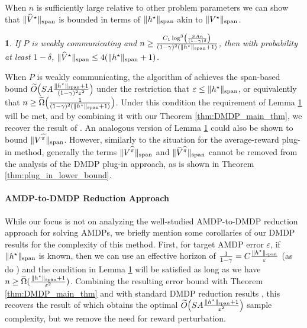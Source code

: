 \documentclass{article}
\theoremstyle{plain}
\theoremstyle{plain}
\newtheorem{lem}[thm]{\protect\lemmaname}
\theoremstyle{remark}
\theoremstyle{plain}
\theoremstyle{plain}
\providecommand{\lemmaname}{Lemma}
\newcommand{\Vhat}{\widehat{V}}
\newcommand{\pihat}{\widehat{\pi}}
\newcommand{\Otilde}{\widetilde{O}}
\newcommand\cig[1]{\scalerel*[5.5pt]{\Big#1}{%
  \ensurestackMath{\addstackgap[1.5pt]{\big#1}}}}
\newcommand{\plugin}{plug-in\xspace}
\begin{document}
When $n$ is sufficiently large relative to other problem parameters we can show that $\spannorm{\Vhat^\star}$ is bounded in terms of $\Vert h^\star\Vert _{\textnormal{span}}$ akin to $\Vert V^\star\Vert _{\textnormal{span}}$.
\begin{lem}
    \label{lem:small_sample_span_bound}
    If $P$ is weakly communicating and $n \geq \frac{C_1  \log^3 \left( \frac{SAn}{(1-\gamma) \delta}\right)}{(1-\gamma)^2 (\Vert h^{\star}\Vert _{\textnormal{span}} +1)}$, then with probability at least $1 - \delta$, $\spannorm{\Vhat^\star} \leq 4(\spannorm{h^\star} + 1)$.
\end{lem}
When $P$ is weakly communicating, the algorithm of \cite{zurek_span-based_2025} achieves the span-based bound $\Otilde\cig(SA \frac{\spannorm{h^\star}+1}{(1-\gamma)^2 \varepsilon^2} \cig)$ under the restriction that $\varepsilon \leq \Vert h^\star\Vert _{\textnormal{span}}$, or equivalently that $n \geq \widetilde{\Omega}\cig( \frac{1}{(1-\gamma)^2 (\spannorm{h^\star}+1)}\cig)$. Under this condition the requirement of Lemma \ref{lem:small_sample_span_bound} will be met, and by combining it with our Theorem \ref{thm:DMDP_main_thm}, we recover the result of \cite{zurek_span-based_2025}. An analogous version of Lemma \ref{lem:small_sample_span_bound} could also be shown to bound $\spannorm{V^{\pihat}}$. However, similarly to the situation for the average-reward \plugin method, generally the terms $\spannorm{V^{\pihat}}$ and $\spannorm{\Vhat^{\pihat}}$ cannot be removed from the analysis of the DMDP \plugin approach, as is shown in Theorem \ref{thm:plug_in_lower_bound}.

\paragraph{AMDP-to-DMDP Reduction Approach} %

While our focus is not on analyzing the well-studied AMDP-to-DMDP reduction approach for solving AMDPs, we briefly mention some corollaries of our DMDP results for the complexity of this method. First, for target AMDP error $\varepsilon$, if $\Vert h^\star\Vert _{\textnormal{span}}$ is known, then we can use an effective horizon of $\frac{1}{1-\gamma} = C \frac{\Vert h^\star\Vert _{\textnormal{span}}}{\varepsilon}$ (as do \cite{wang_near_2022, zurek_span-based_2025}) and the condition in Lemma \ref{lem:small_sample_span_bound} will be satisfied as long as we have $n \geq \widetilde{\Omega}(\frac{\Vert h^\star\Vert _{\textnormal{span}} + 1}{\varepsilon^2})$. Combining the resulting error bound with Theorem \ref{thm:DMDP_main_thm} and with standard DMDP reduction results \citep{wang_near_2022}, this recovers the result of \cite{zurek_span-based_2025} which obtains the optimal $\Otilde\cig(SA\frac{\spannorm{h^\star} + 1}{\varepsilon^2} \cig)$ sample complexity, but we remove the need for reward perturbation.
\end{document}
